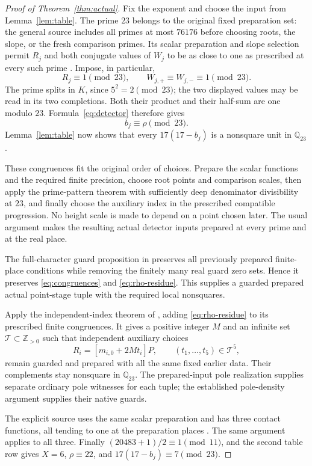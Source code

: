 \documentclass[11pt,a4paper]{article}
\newcommand{\Q}{\mathbb Q}\newcommand{\Z}{\mathbb Z}
\begin{document}
\begin{proof}[Proof of Theorem~\ref{thm:actual}]
Fix the exponent and choose the input from Lemma~\ref{lem:table}.
The prime $23$ belongs to the original fixed preparation set: the general
source includes all primes at most $76176$ before choosing roots, the
slope, or the fresh comparison primes. Its scalar preparation and slope
selection permit $R_j$ and both conjugate values of $W_j$ to be as close
to one as prescribed at every such prime
\cite[Section 5]{General}. Impose, in particular,
\begin{equation}\label{eq:congruences}
 R_j\equiv1\pmod{23},\qquad
 W_{j,+}\equiv W_{j,-}\equiv1\pmod{23}.
\end{equation}
The prime splits in $K$, since $5^2=2\pmod{23}$; the two displayed
values may be read in its two completions. Both their product and their
half-sum are one modulo $23$. Formula~\eqref{eq:detector} therefore gives
\begin{equation}\label{eq:rho-residue}
                           b_j\equiv\rho\pmod{23}.
\end{equation}
Lemma~\ref{lem:table} now shows that every $17(17-b_j)$ is a nonsquare
unit in $\Q_{23}$.

These congruences fit the original order of choices. Prepare the scalar
functions and the required finite precision, choose root points and
comparison scales, then apply the prime-pattern theorem with sufficiently
deep denominator divisibility at $23$, and finally choose the auxiliary
index in the prescribed compatible progression. No height scale is made
to depend on a point chosen later. The usual argument makes the resulting
actual detector inputs prepared at every prime and at the real place.

The full-character guard proposition in \cite[Section 5]{UnitNorm}
preserves all previously prepared finite-place conditions while removing
the finitely many real guard zero sets. Hence it preserves
\eqref{eq:congruences} and \eqref{eq:rho-residue}. This supplies a guarded
prepared actual point-stage tuple with the required local nonsquares.

Apply the independent-index theorem of \cite[Theorem 3.1]{Returns}, adding
\eqref{eq:rho-residue} to its prescribed finite congruences. It gives a
positive integer $M$ and an infinite set $\mathcal T\subset\Z_{>0}$ such
that independent auxiliary choices
\[
                   R_i=[m_{i,0}+2Mt_i]P,
                   \qquad(t_1,\ldots,t_5)\in\mathcal T^5,
\]
remain guarded and prepared with all the same fixed earlier data. Their
complements stay nonsquare in $\Q_{23}$. The prepared-input pole
realization supplies separate ordinary pole witnesses for each tuple;
the established pole-density argument supplies their native guards.

The explicit source uses the same scalar preparation and has three
contact functions, all tending to one at the preparation places
\cite[Section 6]{Explicit}. The same argument applies to all three.
Finally $(20483+1)/2\equiv1\pmod{11}$, and the second table row gives
$X=6$, $\rho\equiv22$, and $17(17-b_j)\equiv7\pmod{23}$.
\end{proof}
\end{document}
